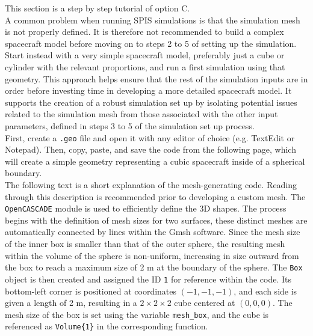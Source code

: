 \documentclass[a4paper, 12pt]{article}
\begin{document}
This section is a step by step tutorial of option C.\\

A common problem when running SPIS simulations is that the simulation mesh is not properly defined. It is therefore not recommended to build a complex spacecraft model before moving on to steps 2 to 5 of setting up the simulation. Start instead with a very simple spacecraft model, preferably just a cube or cylinder with the relevant proportions, and run a first simulation using that geometry. This approach helps ensure that the rest of the simulation inputs are in order before investing time in developing a more detailed spacecraft model. It supports the creation of a robust simulation set up by isolating potential issues related to the simulation mesh from those associated with the other input parameters, defined in steps 3 to 5 of the simulation set up process.\\

First, create a \verb|.geo| file and open it with any editor of choice (e.g. TextEdit or Notepad). Then, copy, paste, and save the code from the following page, which will create a simple geometry representing a cubic spacecraft inside of a spherical boundary.\\

The following text is a short explanation of the mesh-generating code. Reading through this description is recommended prior to developing a custom mesh. The \verb|OpenCASCADE|  module is used to efficiently define the 3D shapes. The process begins with the definition of mesh sizes for two surfaces, these distinct meshes are automatically connected by lines within the Gmsh software. Since the mesh size of the inner box is smaller than that of the outer sphere, the resulting mesh within the volume of the sphere is non-uniform, increasing in size outward from the box to reach a maximum size of 2 m at the boundary of the sphere. The \verb|Box| object is then created and assigned the ID \verb|1| for reference within the code. Its bottom-left corner is positioned at coordinates $(-1, -1, -1)$, and each side is given a length of 2 m, resulting in a $2\times2\times2$ cube centered at $(0, 0, 0)$. The mesh size of the box is set using the variable \verb|mesh_box|, and the cube is referenced as \verb|Volume{1}| in the corresponding function.\\
\end{document}
